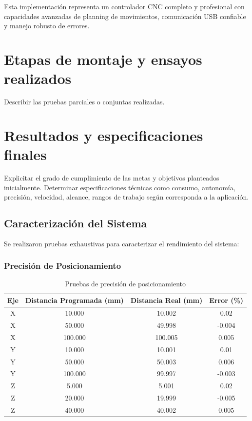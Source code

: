 \documentclass[12pt]{article}
\begin{document}
Esta implementación representa un controlador CNC completo y profesional con capacidades avanzadas de planning de movimientos, comunicación USB confiable y manejo robusto de errores.

\section{Etapas de montaje y ensayos realizados}
Describir las pruebas parciales o conjuntas realizadas.

\section{Resultados y especificaciones finales}
Explicitar el grado de cumplimiento de las metas y objetivos planteados inicialmente.  
Determinar especificaciones técnicas como consumo, autonomía, precisión, velocidad, alcance, rangos de trabajo según corresponda a la aplicación.


\subsection{Caracterización del Sistema}

Se realizaron pruebas exhaustivas para caracterizar el rendimiento del sistema:

\subsubsection{Precisión de Posicionamiento}

\begin{table}[H]
\centering
\caption{Pruebas de precisión de posicionamiento}
\label{tab:precision}
\begin{tabular}{|c|c|c|c|}
\hline
\textbf{Eje} & \textbf{Distancia Programada (mm)} & \textbf{Distancia Real (mm)} & \textbf{Error (\%)} \\
\hline
X & 10.000 & 10.002 & 0.02 \\
X & 50.000 & 49.998 & -0.004 \\
X & 100.000 & 100.005 & 0.005 \\
\hline
Y & 10.000 & 10.001 & 0.01 \\
Y & 50.000 & 50.003 & 0.006 \\
Y & 100.000 & 99.997 & -0.003 \\
\hline
Z & 5.000 & 5.001 & 0.02 \\
Z & 20.000 & 19.999 & -0.005 \\
Z & 40.000 & 40.002 & 0.005 \\
\hline
\end{tabular}
\end{table}
\end{document}

